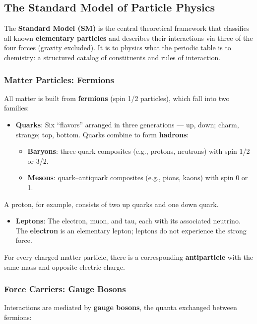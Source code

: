 \documentclass[11pt,a4paper]{article}
\let\originalsubsection\subsection
\renewcommand{\subsection}{\Needspace{8\baselineskip}\originalsubsection}
\begin{document}
\subsection{The Standard Model of Particle Physics}
The \textbf{Standard Model (SM)} is the central theoretical framework that classifies all known \textbf{elementary particles} and describes their interactions via three of the four forces (gravity excluded). It is to physics what the periodic table is to chemistry: a structured catalog of constituents and rules of interaction.

\subsubsection{Matter Particles: Fermions}
All matter is built from \textbf{fermions} (spin 1/2 particles), which fall into two families:

\begin{itemize}
\item \textbf{Quarks}: Six ``flavors'' arranged in three generations --- up, down; charm, strange; top, bottom. Quarks combine to form \textbf{hadrons}:
\begin{itemize}
\item \textbf{Baryons}: three-quark composites (e.g., protons, neutrons) with spin 1/2 or 3/2.
\item \textbf{Mesons}: quark--antiquark composites (e.g., pions, kaons) with spin 0 or 1.
\end{itemize}
\end{itemize}
  A proton, for example, consists of two up quarks and one down quark.

\begin{itemize}
\item \textbf{Leptons}: The electron, muon, and tau, each with its associated neutrino. The \textbf{electron} is an elementary lepton; leptons do not experience the strong force.
\end{itemize}
For every charged matter particle, there is a corresponding \textbf{antiparticle} with the same mass and opposite electric charge.

\subsubsection{Force Carriers: Gauge Bosons}
Interactions are mediated by \textbf{gauge bosons}, the quanta exchanged between fermions:
\end{document}
